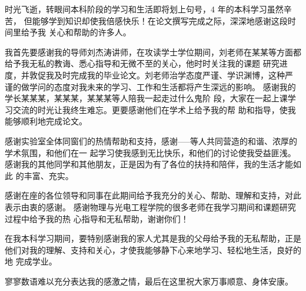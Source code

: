 \begin{thanksfor}
	
时光飞逝，转眼间本科阶段的学习和生活即将划上句号，4 年的本科学习虽然辛苦，
但能够学到知识却使我倍感快乐！在论文撰写完成之际，深深地感谢这段时间里给予我
关心和帮助的许多人。 

我首先要感谢我的导师刘杰涛讲师，在攻读学士学位期间，刘老师在某某等方面都给予我无私的教诲、悉心指导和无微不至的关心，他时时关注我的课题
研究进度，并敦促我及时完成我的毕业论文。刘老师治学态度严谨、学识渊博，这种严
谨的做学问的态度对我未来的学习、工作和生活都将产生深远的影响。 
感谢我的学长某某某，某某某，某某某等人陪我一起走过什么鬼阶
段，大家在一起上课学习交流的时光让我终生难忘。更要感谢他们在学术上给予我的帮
助和指导，使我能够顺利地完成论文。 

感谢实验室全体同窗们的热情帮助和支持，感谢-----等人共同营造的和谐、浓厚的学术氛围，和他们在一
起学习使我感到无比快乐，和他们的讨论使我受益匪浅。 
感谢我的其他同学和其他朋友，正是因为有了各位的扶持和陪伴，我的生活才能如此
的丰富、充实。 

感谢在座的各位领导和同事在此期间给予我充分的关心、帮助、理解和支持，对此表示由衷的感谢。
感谢物理与光电工程学院的很多老师在我学习期间和课题研究过程中给予我的热
心指导和无私帮助，谢谢你们！ 

在我本科学习期间，要特别感谢我的家人尤其是我的父母给予我的无私帮助，正是他们对我的理解、支持和关心，才使我能够静下心来地学习、轻松地生活，良好的地
完成学业。 

寥寥数语难以充分表达我的感激之情，最后在这里祝大家万事顺意、身体安康。 

\end{thanksfor}